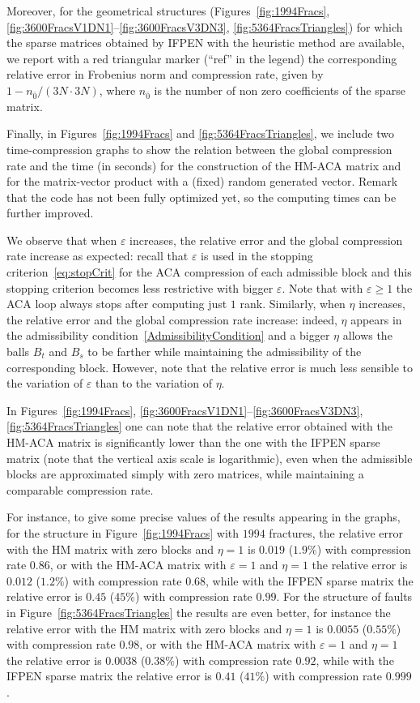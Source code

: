 Moreover, for the geometrical structures (Figures~\ref{fig:1994Fracs}, \ref{fig:3600FracsV1DN1}--\ref{fig:3600FracsV3DN3}, \ref{fig:5364FracsTriangles}) for which the sparse matrices obtained by IFPEN with the heuristic method are available, we report with a red triangular marker (``ref'' in the legend) the corresponding relative error in Frobenius norm and compression rate, given by $1- n_{\bar{0}}/(3N\cdot3N)$, where $n_{\bar{0}}$ is the number of non zero coefficients of the sparse matrix.

Finally, in Figures~\ref{fig:1994Fracs} and \ref{fig:5364FracsTriangles}, we include two time-compression graphs to show the relation between the global compression rate and the time (in seconds) for the construction of the HM-ACA matrix and for the matrix-vector product with a (fixed) random generated vector. Remark that the code has not been fully optimized yet, so the computing times can be further improved.  

\bigskip
We observe that when $\varepsilon$ increases, the relative error and the global compression rate increase as expected: recall that $\varepsilon$ is used in the stopping criterion~\eqref{eq:stopCrit} for the ACA compression of each admissible block and this stopping criterion becomes less restrictive with bigger $\varepsilon$. Note that with $\varepsilon \ge 1$ the ACA loop always stops after computing just $1$ rank. 
Similarly, when $\eta$ increases, the relative error and the global compression rate increase: indeed, $\eta$ appears in the admissibility condition~\eqref{AdmissibilityCondition} and a bigger $\eta$ allows the balls $B_t$ and $B_s$ to be farther while maintaining the admissibility of the corresponding block.
However, note that the relative error is much less sensible to the variation of $\varepsilon$ than to the variation of $\eta$.

In Figures~\ref{fig:1994Fracs}, \ref{fig:3600FracsV1DN1}--\ref{fig:3600FracsV3DN3}, \ref{fig:5364FracsTriangles} one can note that the relative error obtained with the HM-ACA matrix is significantly lower than the one with the IFPEN sparse matrix (note that the vertical axis scale is logarithmic), even when the admissible blocks are approximated simply with zero matrices, while maintaining a comparable compression rate. 

For instance, to give some precise values of the results appearing in the graphs, for the structure in Figure~\ref{fig:1994Fracs} with $1994$ fractures, the relative error with the HM matrix with zero blocks and $\eta=1$ is $0.019$ ($1.9 \%$) with compression rate $0.86$, or with the HM-ACA matrix with $\varepsilon=1$ and $\eta=1$ the relative error is $0.012$ ($1.2 \%$) with compression rate $0.68$, while with the IFPEN sparse matrix the relative error is $0.45$ ($45 \%$) with compression rate $0.99$.  
For the structure of faults in Figure~\ref{fig:5364FracsTriangles} the results are even better, for instance 
the relative error with the HM matrix with zero blocks and $\eta=1$ is $0.0055$ ($0.55 \%$) with compression rate $0.98$, or with the HM-ACA matrix with $\varepsilon=1$ and $\eta=1$ the relative error is $0.0038$ ($0.38 \%$) with compression rate $0.92$, while with the IFPEN sparse matrix the relative error is $0.41$ ($41 \%$) with compression rate $0.999$.
 
